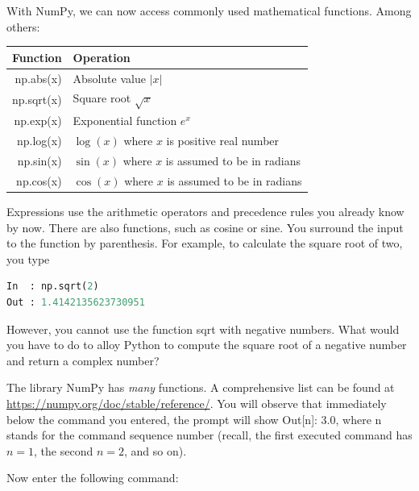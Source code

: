 \vs



With NumPy, we can now access commonly used mathematical functions. Among others: \vs

\begin{tabular}{r|l}
Function 			& Operation \\
\hline
np.abs(x)   		& Absolute value $|x|$ \\
np.sqrt(x)			&  Square root $\sqrt{x}$ \\
np.exp(x) 			& Exponential function $e^x$ \\
np.log(x) 			& $\log(x)$ where $x$ is positive real number\\
np.sin(x)			&  $\sin(x)$ where $x$ is assumed to be in radians \\
np.cos(x) 			& $\cos(x)$ where $x$ is assumed to be in radians \\
\hline
\end{tabular}

\vs 
Expressions use the arithmetic operators and precedence rules you already know by now.
There are also functions, such as cosine or sine. You surround the
input to the function by parenthesis. For example, to calculate the
square root of two, you type

\begin{lstlisting}[language=Python]
In 	: np.sqrt(2)
Out	: 1.4142135623730951
\end{lstlisting}

However, you cannot use the function {\s sqrt} with negative numbers. What would you have to do to alloy Python to compute the square root of a negative number and return a complex number? \QA  %

The library NumPy has \textit{many} functions. A comprehensive list can be found at \url{https://numpy.org/doc/stable/reference/}. You will observe that immediately below the command you entered, the prompt will show {\s Out[n]: 3.0}, where {\s n} stands for the command sequence number (recall, the first executed command has $n=1$, the second $n=2$, and so on).

Now enter the following command: 

